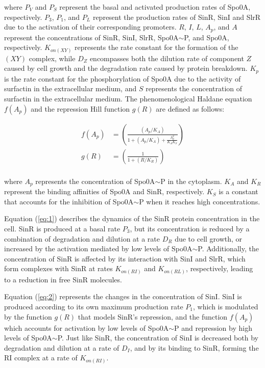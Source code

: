 where  \(P_V\) and \(P_S\) represent the basal and activated production rates of Spo0A, respectively.
\(P_3\), \(P_1\), and \(P_L\) represent the 
 production rates of SinR, SinI and SlrR due to the activation of their corresponding promoters.
 \(R\), \(I\), \(L\), \(A_p\), and \(A\) represent the concentrations of SinR, SinI, SlrR, Spo0A$\sim$P, and Spo0A, respectively.
  \(K_{on(XY)}\) represents the rate constant for the formation of the $(XY)$ complex,
   while \(D_Z\) encompasses both the dilution rate of component $Z$ caused by cell
    growth and the degradation rate caused by protein breakdown. 
    \(K_p\) is the rate constant for the phosphorylation of Spo0A due to the activity of surfactin in the extracellular medium, 
and \(S\) represents the concentration of surfactin in the extracellular medium.
    The phenomenological 
    Haldane equation \(f(A_p)\) and the repression Hill function \(g(R)\) are defined as follows:


\begin{align*}
    f(A_p) &= \left(\frac{(A_p/K_A)}{1 + (A_p/K_A)+ \frac{A_p^2}{K_A K_S }} \right) \\ 
    g(R) &= \left(\frac{1}{1 + (R/K_R)}\right) \\
\end{align*}  

where $A_p$ represents the concentration of Spo0A$\sim$P in the cytoplasm. \(K_{A}\) and \(K_R\) represent
 the binding affinities of Spo0A and SinR, respectively. \(K_S\) is a constant that accounts for the inhibition of Spo0A$\sim$P 
 when it reaches high concentrations.

Equation (\ref{eq:1}) describes the dynamics of the SinR protein concentration in the cell. SinR is 
produced at a basal rate $P_3$, but its concentration is reduced by a combination of degradation and dilution 
at a rate $D_R$ due to cell growth, or 
increased by the activation mediated by low levels of Spo0A$\sim$P.
Additionally, the concentration of SinR is affected by its interaction with SinI and SlrR, which form complexes with SinR at rates $K_{on(RI)}$ and $K_{on(RL)}$, respectively, leading to a reduction in free SinR molecules.

Equation (\ref{eq:2}) represents the changes in the concentration of SinI. SinI is produced according to its own maximum production rate $P_1$, which is modulated by the function $g(R)$ that models SinR's repression, and the
 function $f(A_p)$ which accounts for activation by low levels of Spo0A$\sim$P and repression by high 
 levels of Spo0A$\sim$P. Just like SinR, the concentration of SinI is decreased both by degradation and dilution at a rate of $D_I$, and by its binding to SinR, forming the RI complex at a rate of $K_{on(RI)}$.

